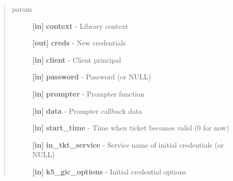 \documentclass[letterpaper,10pt,english]{sphinxmanual}
\begin{document}
\begin{quote}\begin{description}
\item[{param}] \leavevmode
\textbf{{[}in{]}} \textbf{context} - Library context

\textbf{{[}out{]}} \textbf{creds} - New credentials

\textbf{{[}in{]}} \textbf{client} - Client principal

\textbf{{[}in{]}} \textbf{password} - Password (or NULL)

\textbf{{[}in{]}} \textbf{prompter} - Prompter function

\textbf{{[}in{]}} \textbf{data} - Prompter callback data

\textbf{{[}in{]}} \textbf{start\_time} - Time when ticket becomes valid (0 for now)

\textbf{{[}in{]}} \textbf{in\_tkt\_service} - Service name of initial credentials (or NULL)

\textbf{{[}in{]}} \textbf{k5\_gic\_options} - Initial credential options

\end{description}\end{quote}
\end{document}
